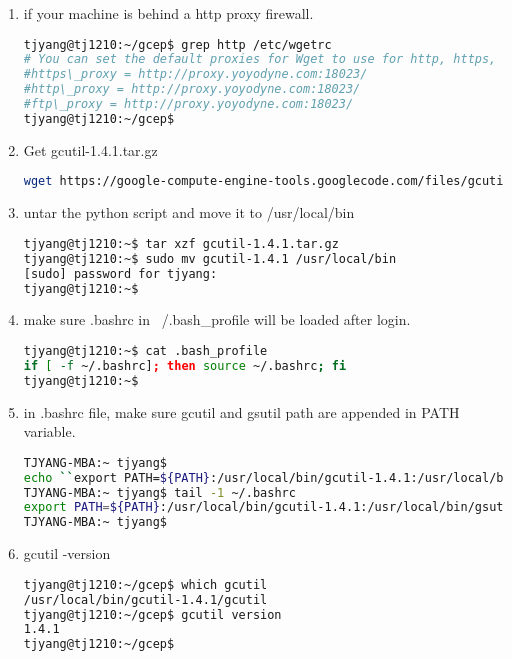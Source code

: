 \begin{enumerate}
\item if your machine is behind a http proxy firewall.
  \begin{lstlisting}[language=Bash]
tjyang@tj1210:~/gcep$ grep http /etc/wgetrc 
# You can set the default proxies for Wget to use for http, https, and ftp.
#https\_proxy = http://proxy.yoyodyne.com:18023/
#http\_proxy = http://proxy.yoyodyne.com:18023/
#ftp\_proxy = http://proxy.yoyodyne.com:18023/
tjyang@tj1210:~/gcep$ 
  \end{lstlisting}
\item Get gcutil-1.4.1.tar.gz
  \begin{lstlisting}[language=Bash]
   wget https://google-compute-engine-tools.googlecode.com/files/gcutil-1.4.1.tar.gz
  \end{lstlisting}
\item untar the python script and move it to /usr/local/bin
  \begin{lstlisting}[language=Bash]
tjyang@tj1210:~$ tar xzf gcutil-1.4.1.tar.gz 
tjyang@tj1210:~$ sudo mv gcutil-1.4.1 /usr/local/bin
[sudo] password for tjyang: 
tjyang@tj1210:~$ 
  \end{lstlisting}
\item make sure .bashrc in ~/.bash\_profile will be loaded after login.
  \begin{lstlisting}[language=Bash]
tjyang@tj1210:~$ cat .bash_profile 
if [ -f ~/.bashrc]; then source ~/.bashrc; fi
tjyang@tj1210:~$ 
  \end{lstlisting}
\item in .bashrc file, make sure gcutil and gsutil path are appended in PATH variable.
  \begin{lstlisting}[language=Bash]
TJYANG-MBA:~ tjyang$ 
echo ``export PATH=${PATH}:/usr/local/bin/gcutil-1.4.1:/usr/local/bin/gsutil'' >> ~/.bashrc
TJYANG-MBA:~ tjyang$ tail -1 ~/.bashrc
export PATH=${PATH}:/usr/local/bin/gcutil-1.4.1:/usr/local/bin/gsutil
TJYANG-MBA:~ tjyang$ 
  \end{lstlisting}

\item gcutil -version
  \begin{lstlisting}[language=Bash]
tjyang@tj1210:~/gcep$ which gcutil
/usr/local/bin/gcutil-1.4.1/gcutil
tjyang@tj1210:~/gcep$ gcutil version
1.4.1
tjyang@tj1210:~/gcep$ 
  \end{lstlisting}
\end{enumerate}

